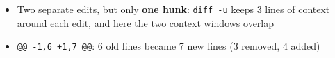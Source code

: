 \documentclass[aspectratio=169,10pt,compress]{beamer}
\begin{document}
\begin{frame}[t,fragile]
\begin{center}
\end{center}
\vspace{-0.6em}
\vspace{-0.2em}
\small
\begin{itemize}
  \item Two separate edits, but only \textbf{one hunk}: \texttt{diff -u} keeps 3 lines of
        context around each edit, and here the two context windows overlap
  \item \texttt{@@ -1,6 +1,7 @@}: 6 old lines became 7 new lines (3 removed, 4 added)
\end{itemize}
\end{frame}
\end{document}
